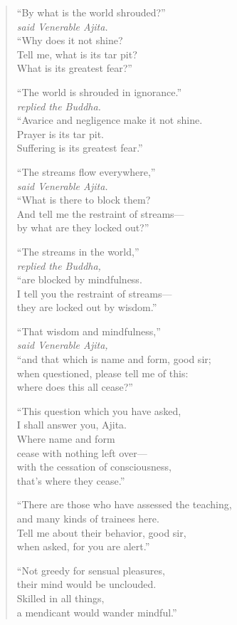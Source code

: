 \documentclass[12pt,openany]{book}%
\newcommand*{\scspeaker}[1]{\hspace{2em}\textit{#1}}
\begin{document}
\begin{verse}%
“By what is the world shrouded?” \\
\scspeaker{said Venerable Ajita. }\\
“Why does it not shine? \\
Tell me, what is its tar pit? \\
What is its greatest fear?” 

“The world is shrouded in ignorance.” \\
\scspeaker{replied the Buddha. }\\
“Avarice and negligence make it not shine. \\
Prayer is its tar pit. \\
Suffering is its greatest fear.” 

“The streams flow everywhere,” \\
\scspeaker{said Venerable Ajita. }\\
“What is there to block them? \\
And tell me the restraint of streams—\\
by what are they locked out?” 

“The streams in the world,” \\
\scspeaker{replied the Buddha, }\\
“are blocked by mindfulness. \\
I tell you the restraint of streams—\\
they are locked out by wisdom.” 

“That wisdom and mindfulness,” \\
\scspeaker{said Venerable Ajita, }\\
“and that which is name and form, good sir; \\
when questioned, please tell me of this: \\
where does this all cease?” 

“This question which you have asked, \\
I shall answer you, Ajita. \\
Where name and form \\
cease with nothing left over—\\
with the cessation of consciousness, \\
that’s where they cease.” 

“There are those who have assessed the teaching, \\
and many kinds of trainees here. \\
Tell me about their behavior, good sir, \\
when asked, for you are alert.” 

“Not greedy for sensual pleasures, \\
their mind would be unclouded. \\
Skilled in all things, \\
a mendicant would wander mindful.” 

%
\end{verse}
\end{document}
